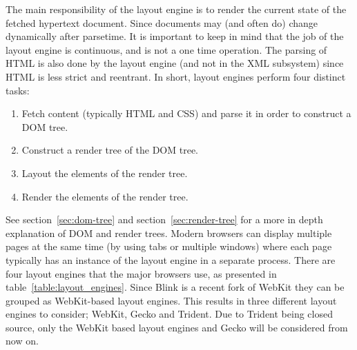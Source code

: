 \documentclass[a4paper,11pt]{kth-mag}
\begin{document}
      The main responsibility of the \gls{layout engine} is to render the current state of the fetched \gls{hypertext} document.
      Since documents may (and often do) change dynamically after parsetime.
      It is important to keep in mind that the job of the \gls{layout engine} is continuous, and is not a one time operation.
      The parsing of \gls{HTML} is also done by the \gls{layout engine} (and not in the \gls{XML} subsystem) since \gls{HTML} is less strict and reentrant.
      In short, \glspl{layout engine} perform four distinct tasks:
      \begin{enumerate}
        \item Fetch content (typically \gls{HTML} and \gls{CSS}) and parse it in order to construct a \gls{DOM} tree. 
        \item Construct a \gls{render tree} of the \gls{DOM} tree.
        \item Layout the \glspl{element} of the \gls{render tree}.
        \item Render the \glspl{element} of the \gls{render tree}.
      \end{enumerate}
      See section~\ref{sec:dom-tree} and section~\ref{sec:render-tree} for a more in depth explanation of \gls{DOM} and \glspl{render tree}.
      Modern \glspl{browser} can display multiple pages at the same time (by using tabs or multiple windows) where each page typically has an instance of the \gls{layout engine} in a separate process.
      There are four \glspl{layout engine} that the major \glspl{browser} use, as presented in table~\ref{table:layout_engines}.
      Since Blink is a recent \gls{fork} of \gls{WebKit} they can be grouped as \gls{WebKit}-based \glspl{layout engine}.
      This results in three different \glspl{layout engine} to consider; \gls{WebKit}, Gecko and Trident.
      Due to Trident being closed source, only the \gls{WebKit} based \glspl{layout engine} and Gecko will be considered from now on.
\end{document}
